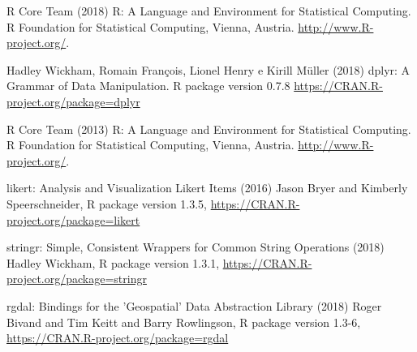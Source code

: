 \documentclass[11pt,a4paper]{article}
\begin{document}
\begin{thebibliography}{9}

R Core Team (2018) R: A Language and Environment for Statistical Computing. R Foundation for Statistical
Computing, Vienna, Austria. \url{http://www.R-project.org/}.

 Hadley Wickham, Romain François,  Lionel Henry e Kirill Müller (2018) dplyr: A Grammar of Data Manipulation. R package version 0.7.8 \url{https://CRAN.R-project.org/package=dplyr}

R Core Team (2013) R: A Language and Environment for Statistical Computing. R Foundation for Statistical
Computing, Vienna, Austria. \url{http://www.R-project.org/}.

likert: Analysis and Visualization Likert Items (2016) Jason Bryer and Kimberly Speerschneider, R package version 1.3.5, \url{https://CRAN.R-project.org/package=likert}

stringr: Simple, Consistent Wrappers for Common String Operations (2018) Hadley Wickham,
R package version 1.3.1,  \url{https://CRAN.R-project.org/package=stringr}

rgdal: Bindings for the 'Geospatial' Data Abstraction Library (2018) Roger Bivand and Tim Keitt and Barry Rowlingson, R package version 1.3-6, \url{https://CRAN.R-project.org/package=rgdal}
\end{thebibliography}
\end{document}

